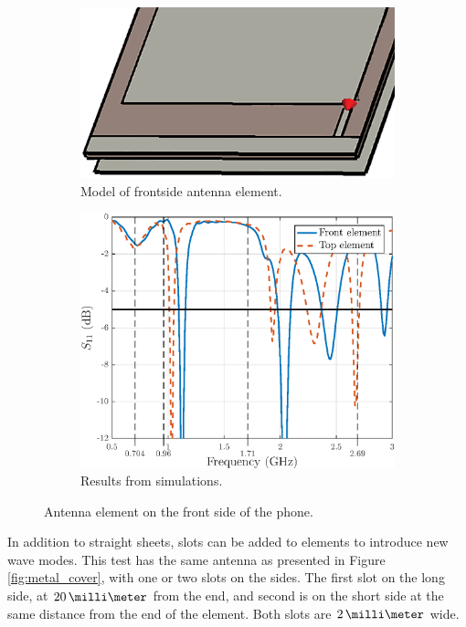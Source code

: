 \begin{figure}[H]
    \centering
    \begin{subfigure}[b]{0.49\textwidth}
        \includegraphics[width=\textwidth]{img/front.eps}
        \caption{Model of frontside antenna element.}
        \label{fig:front_model}
    \end{subfigure}
    \begin{subfigure}[b]{0.49\textwidth}
        \includegraphics[width=\textwidth]{img/front_res.eps}
        \caption{Results from simulations.}
        \label{fig:front_res}
    \end{subfigure}
    \caption{Antenna element on the front side of the phone.}
    \label{fig:front_elem}
\end{figure}

In addition to straight sheets, slots can be added to elements to introduce new wave modes. This test has the same antenna as presented in Figure \ref{fig:metal_cover}, with one or two slots on the sides. The first slot on the long side, at $20\,\milli\meter$ from the end, and second is on the short side at the same distance from the end of the element. Both slots are $2\,\milli\meter$ wide.

